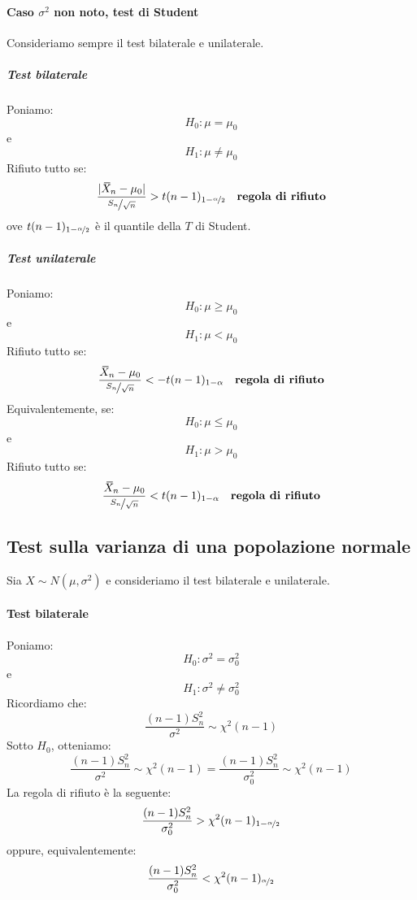 \documentclass[12pt]{report}
\newcommand{\wbar}[1]{%
	\accentset{\mbox{\rule{0.55em}{0.5pt}}}{#1}%
}
\begin{document}
		\paragraph{Caso $\sigma^2$ non noto, test di Student} Consideriamo sempre il test bilaterale e unilaterale.
		\subparagraph{Test bilaterale}
		Poniamo:
		\[
		H_0: \mu = \mu_0
		\]
		e
		\[
		H_1: \mu \neq \mu_0
		\]
		Rifiuto tutto se:
		\[
		\frac{|\wbar{X}_n - \mu_0|}{\nicefrac{S_n}{\sqrt{n}}} > t(n-1)_{1 - \nicefrac{\alpha}{2}} \quad \textbf{regola di rifiuto}
		\]
		ove $t(n-1)_{1-\nicefrac{\alpha}{2}}$ è il quantile della $T$ di Student.
		\subparagraph{Test unilaterale}  Poniamo:
		\[
		H_0: \mu \geq \mu_0
		\]
		e
		\[
		H_1: \mu < \mu_0
		\]
		Rifiuto tutto se:
		\[
		\frac{\wbar{X}_n - \mu_0}{\nicefrac{S_n}{\sqrt{n}}} < -t(n-1)_{1 - \alpha} \quad \textbf{regola di rifiuto}
		\]
		Equivalentemente, se:
		\[
		H_0: \mu \leq \mu_0
		\]
		e
		\[
		H_1: \mu > \mu_0
		\]
		Rifiuto tutto se:
		\[
		\frac{\wbar{X}_n - \mu_0}{\nicefrac{S_n}{\sqrt{n}}} < t(n-1)_{1 - \alpha} \quad \textbf{regola di rifiuto}
		\]
		\subsection{Test sulla varianza di una popolazione normale}
		Sia $X\sim N(\mu, \sigma^2)$ e consideriamo il test bilaterale e unilaterale.
		\paragraph{Test bilaterale} Poniamo:
		\[
		H_0: \sigma^2 = \sigma_0^2
		\]
		e
		\[
		H_1: \sigma^2 \neq \sigma_0^2
		\]
		Ricordiamo che:
		\[
		\frac{(n-1)S_n^2}{\sigma^2} \sim \chi^2(n-1)
		\]
		Sotto $H_0$, otteniamo:
		\[
	\frac{(n-1)S_n^2}{\sigma^2} \sim \chi^2(n-1) = \frac{(n-1)S_n^2}{\sigma_0^2} \sim \chi^2(n-1)
		\]
		La regola di rifiuto è la seguente:
		\[
		\frac{(n-1)S_n^2}{\sigma_0^2} > \chi^2(n-1)_{1-\nicefrac{\alpha}{2}}
		\]
		oppure, equivalentemente:
		\[
		\frac{(n-1)S_n^2}{\sigma_0^2} < \chi^2(n-1)_{\nicefrac{\alpha}{2}}
		\]
\end{document}
